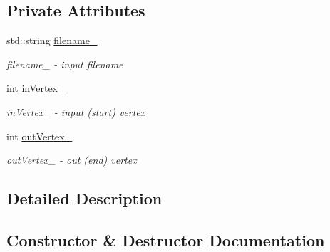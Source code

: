 \subsection*{Private Attributes}
\begin{DoxyCompactItemize}
\item 
std\+::string \hyperlink{a00005_ab906462d177f146fcd35aa0011868eda_ab906462d177f146fcd35aa0011868eda}{filename\+\_\+}
\begin{DoxyCompactList}\small\item\em filename\+\_\+ -\/ input filename \end{DoxyCompactList}\item 
int \hyperlink{a00005_ae0824ff65f78a73500e1bd4cb6521629_ae0824ff65f78a73500e1bd4cb6521629}{in\+Vertex\+\_\+}
\begin{DoxyCompactList}\small\item\em in\+Vertex\+\_\+ -\/ input (start) vertex \end{DoxyCompactList}\item 
int \hyperlink{a00005_aa46cc8f01d18634a14d309e88942afa8_aa46cc8f01d18634a14d309e88942afa8}{out\+Vertex\+\_\+}
\begin{DoxyCompactList}\small\item\em out\+Vertex\+\_\+ -\/ out (end) vertex \end{DoxyCompactList}\end{DoxyCompactItemize}


\subsection{Detailed Description}


\subsection{Constructor \& Destructor Documentation}
